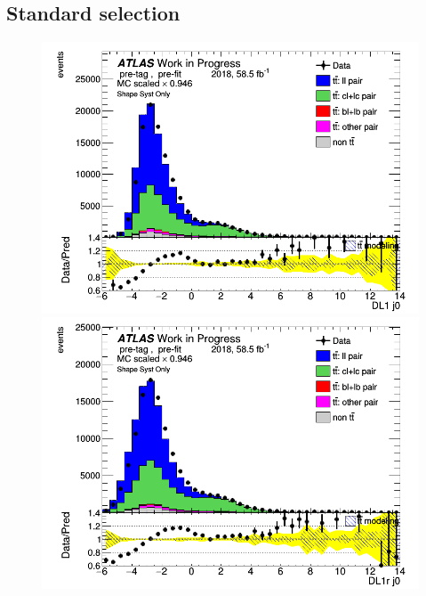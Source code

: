 \documentclass[letterpaper,12pt]{article}
\begin{document}
\subsection{Standard selection}
\begin{figure}[H]
\begin{minipage}[b]{.45\textwidth}
\centering
\includegraphics[width=1\textwidth]{Distribution_March/DataMC_J0_DL1.png}
\end{minipage}\hfill
\begin{minipage}[b]{.45\textwidth}
\centering
\includegraphics[width=1\textwidth]{Distribution_March/DataMC_J0_DL1r.png}
\end{minipage}\hfill
\begin{minipage}[b]{.45\textwidth}
\centering

\end{minipage}
\end{figure}
\end{document}
